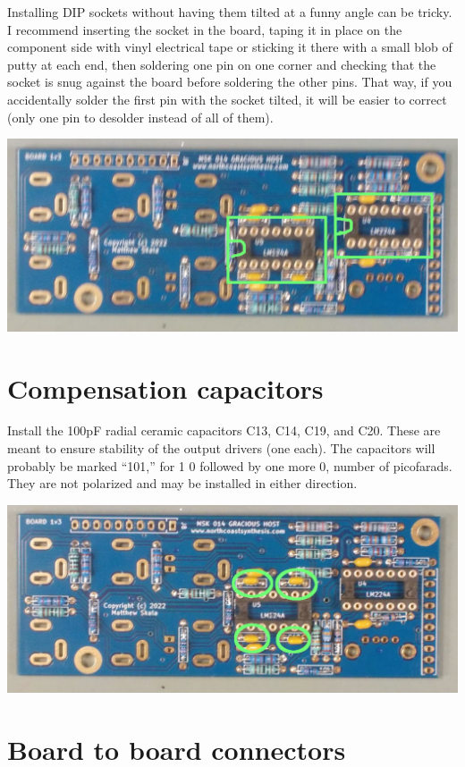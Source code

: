 Installing DIP sockets without having them tilted at a funny angle can be
tricky.  I recommend inserting the socket in the board, taping it in place
on the component side with vinyl electrical tape or sticking it there with a
small blob of putty at each end, then soldering one pin on
one corner and checking that the socket is snug against the board before
soldering the other pins.  That way, if you accidentally solder the first
pin with the socket tilted, it will be easier to correct (only one pin to
desolder instead of all of them).

\nopagebreak
\noindent\includegraphics[width=\linewidth]{dip14.jpg}

\section{Compensation capacitors}

Install the 100pF radial ceramic capacitors C13, C14, C19, and C20.  These
are meant to ensure stability of the output drivers (one each).  The
capacitors will probably be marked ``101,'' for 1 0 followed by one more 0,
number of picofarads.  They are not polarized and may be installed in either
direction.

\nopagebreak
\noindent\includegraphics[width=\linewidth]{cap-100p.jpg}

\section{Board to board connectors}

